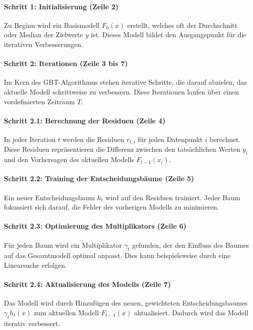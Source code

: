 \paragraph{Schritt 1: Initialisierung (Zeile 2)}\label{para:GBT_Initialisierung}
\label{para:gbt_algo_s1}
Zu Beginn wird ein Basismodell \( F_0(x) \) erstellt, welches oft der Durchschnitt oder Median der Zielwerte \( y \) ist. Dieses Modell bildet den Ausgangspunkt für die iterativen Verbesserungen.

\paragraph{Schritt 2: Iterationen (Zeile 3 bis 7)}
\label{para:gbt_algo_s2}
Im Kern des GBT-Algorithmus stehen iterative Schritte, die darauf abzielen, das aktuelle Modell schrittweise zu verbessern. Diese Iterationen laufen über einen vordefinierten Zeitraum \( T \).

\paragraph{Schritt 2.1: Berechnung der Residuen (Zeile 4)}
\label{para:gbt_algo_s2.1}
In jeder Iteration \( t \) werden die Residuen \( r_{t,i} \) für jeden Datenpunkt \( i \) berechnet. Diese Residuen repräsentieren die Differenz zwischen den tatsächlichen Werten \( y_i \) und den Vorhersagen des aktuellen Modells \( F_{t-1}(x_i) \).

\paragraph{Schritt 2.2: Training der Entscheidungsbäume (Zeile 5)}
\label{para:gbt_algo_s2.2}
Ein neuer Entscheidungsbaum \( h_t \) wird auf den Residuen trainiert. Jeder Baum fokussiert sich darauf, die Fehler des vorherigen Modells zu minimieren.

\paragraph{Schritt 2.3: Optimierung des Multiplikators (Zeile 6)}
\label{para:gbt_algo_s2.3}
Für jeden Baum wird ein Multiplikator \( \gamma_t \) gefunden, der den Einfluss des Baumes auf das Gesamtmodell optimal anpasst. Dies kann beispielsweise durch eine Linearsuche erfolgen.

\paragraph{Schritt 2.4: Aktualisierung des Modells (Zeile 7)}
\label{para:gbt_algo_s2.4}
Das Modell wird durch Hinzufügen des neuen, gewichteten Entscheidungsbaumes \( \gamma_t h_t(x) \) zum aktuellen Modell \( F_{t-1}(x) \) aktualisiert. Dadurch wird das Modell iterativ verbessert.

